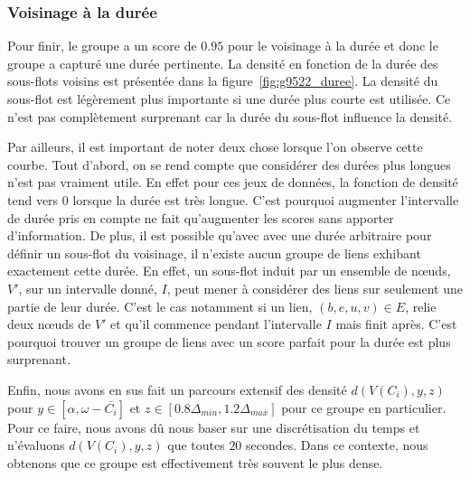 \subsubsection*{Voisinage à la durée}
Pour finir, le groupe a un score de $0.95$ pour le voisinage à la durée et donc le groupe a capturé une durée  pertinente.
La densité en fonction de la durée des sous-flots voisins est présentée dans la figure~\ref{fig:g9522_duree}.
La densité du sous-flot est légèrement plus importante si une durée plus courte est utilisée.
Ce n'est pas complètement surprenant car la durée du sous-flot influence la densité.

Par ailleurs, il est important de noter deux chose lorsque l'on observe cette courbe.
Tout d'abord, on se rend compte que considérer des durées plus longues n'est pas vraiment utile.
En effet pour ces jeux de données, la fonction de densité tend vers $0$ lorsque la durée est très longue.
C'est pourquoi augmenter l'intervalle de durée pris en compte ne fait qu'augmenter les scores sans apporter d'information.
De plus, il est possible qu'avec avec une durée arbitraire pour définir un sous-flot du voisinage, il n'existe aucun groupe de liens exhibant exactement cette durée.
En effet, un sous-flot induit par un ensemble de n\oe{}uds, $V'$, sur un intervalle donné, $I$, peut mener à considérer des liens sur seulement une partie de leur durée.
C'est le cas notamment si un lien, $(b,e,u,v) \in E$, relie deux n\oe{}uds de $V'$ et qu'il commence pendant l'intervalle $I$ mais finit après.
C'est pourquoi trouver un groupe de liens avec un score parfait pour la durée est plus surprenant.

\bigskip

Enfin, nous avons en sus fait un parcours extensif des densité $d(V(C_i),y,z)$ pour $y \in [\alpha, \omega - \bar{C_i}]$ et $z \in [0.8\Delta_{min}, 1.2\Delta_{max}]$ pour ce groupe en particulier.
Pour ce faire, nous avons dû nous baser sur une discrétisation du temps et n'évaluons $d(V(C_i),y,z)$ que toutes $20$ secondes.
Dans ce contexte, nous obtenons que ce groupe est effectivement très souvent le plus dense.

